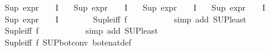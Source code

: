 \begin{isabellebody}
\ {\isachardoublequoteopen}Sup\ {\isacharparenleft}{\kern0pt}{\isacharparenleft}{\kern0pt}expr{\isacharunderscore}{\kern0pt}{}\ {\isasymcirc}\ {\isasymPhi}{\isacharparenright}{\kern0pt}\ {\isacharbackquote}{\kern0pt}\ I{\isacharparenright}{\kern0pt}\ {\isasymle}\ {}{\isachardoublequoteclose}\isanewline
{}\ {\isachardoublequoteopen}Sup\ {\isacharparenleft}{\kern0pt}{\isacharparenleft}{\kern0pt}expr{\isacharunderscore}{\kern0pt}{}\ {\isasymcirc}\ {\isasymPhi}{\isacharparenright}{\kern0pt}\ {\isacharbackquote}{\kern0pt}\ I{\isacharparenright}{\kern0pt}\ {\isasymle}\ {}{\isachardoublequoteclose}\isanewline
{}\ {\isachardoublequoteopen}Sup\ {\isacharparenleft}{\kern0pt}{\isacharparenleft}{\kern0pt}expr{\isacharunderscore}{\kern0pt}{}\ {\isasymcirc}\ {\isasymPhi}{\isacharparenright}{\kern0pt}\ {\isacharbackquote}{\kern0pt}\ I{\isacharparenright}{\kern0pt}\ {\isasymle}\ {}{\isachardoublequoteclose}\isanewline
{}\ {\isachardoublequoteopen}Sup\ {\isacharparenleft}{\kern0pt}{\isacharparenleft}{\kern0pt}expr{\isacharunderscore}{\kern0pt}{}\ {\isasymcirc}\ {\isasymPhi}{\isacharparenright}{\kern0pt}\ {\isacharbackquote}{\kern0pt}\ I{\isacharparenright}{\kern0pt}\ {\isasymle}\ {}{\isachardoublequoteclose}\isanewline
{}\ {\isachardoublequoteopen}Sup\ {\isacharparenleft}{\kern0pt}{\isacharparenleft}{\kern0pt}expr{\isacharunderscore}{\kern0pt}{}\ {\isasymcirc}\ {\isasymPhi}{\isacharparenright}{\kern0pt}\ {\isacharbackquote}{\kern0pt}\ I{\isacharparenright}{\kern0pt}\ {\isasymle}\ {}{\isachardoublequoteclose}\isanewline
\ \ \ \ \isamarkupfalse%
\ Sup{\isacharunderscore}{\kern0pt}le{\isacharunderscore}{\kern0pt}iff\ f{}\isanewline
\ \ \ \ \ \ \ \ \ \isamarkupfalse%
\ {\isacharparenleft}{\kern0pt}simp\ add{\isacharcolon}{\kern0pt}\ SUP{\isacharunderscore}{\kern0pt}least{\isacharparenright}{\kern0pt}\isanewline
\ \ \ \ \isamarkupfalse%
\ Sup{\isacharunderscore}{\kern0pt}le{\isacharunderscore}{\kern0pt}iff\ f{}\isanewline
\ \ \ \ \ \ \ \ \ \isamarkupfalse%
\ {\isacharparenleft}{\kern0pt}simp\ add{\isacharcolon}{\kern0pt}\ SUP{\isacharunderscore}{\kern0pt}least{\isacharparenright}{\kern0pt}\isanewline
\ \ \ \ \isamarkupfalse%
\ Sup{\isacharunderscore}{\kern0pt}le{\isacharunderscore}{\kern0pt}iff\ f{}\ SUP{\isacharunderscore}{\kern0pt}bot{\isacharunderscore}{\kern0pt}conv{\isacharparenleft}{\kern0pt}{}{\isacharparenright}{\kern0pt}\ bot{\isacharunderscore}{\kern0pt}enat{\isacharunderscore}{\kern0pt}def\isanewline

\end{isabellebody}
